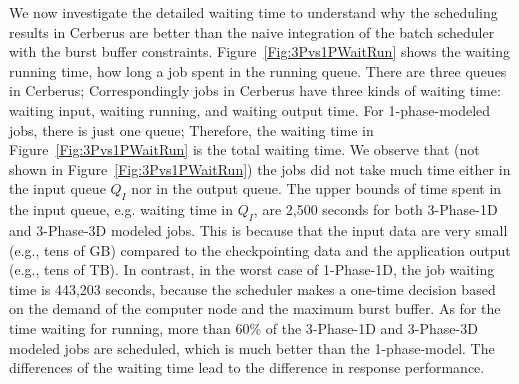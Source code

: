 We now investigate the detailed waiting time to understand why the scheduling results in Cerberus
are better than the naive integration of the batch scheduler with the burst buffer constraints.
Figure~\ref{Fig:3Pvs1PWaitRun} shows the waiting running time, how long a job spent in the running queue.
There are three queues in Cerberus;
Correspondingly jobs in Cerberus have three kinds of waiting time: waiting input, waiting running, and waiting output time.
For 1-phase-modeled jobs, there is just one queue;
Therefore, the waiting time in Figure~\ref{Fig:3Pvs1PWaitRun} is the total waiting time.
We observe that (not shown in Figure~\ref{Fig:3Pvs1PWaitRun}) the jobs did not
take much time either in the input queue $Q_I$ nor in the output queue.
The upper bounds of time spent in the input queue, e.g. waiting time in $Q_I$, are 
2,500 seconds for both 3-Phase-1D and 3-Phase-3D modeled jobs.
This is because that the input data are very small (e.g., tens of GB)
compared to the checkpointing data and the application output (e.g., tens of TB).
In contrast, in the worst case of 1-Phase-1D, the job waiting time is 443,203 seconds,
because the scheduler makes a one-time decision based on the demand of the computer node and the maximum burst buffer.
As for the time waiting for running, more than 60\% of the 3-Phase-1D and 3-Phase-3D modeled jobs are scheduled,
which is much better than the 1-phase-model.
The differences of the waiting time lead to the difference in response performance.



